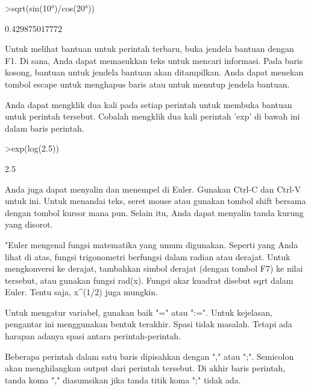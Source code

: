 \documentclass[12pt,arial,letterpaper]{book}
\begin{document}
\begin{eulerprompt}
>sqrt(sin(10°)/cos(20°))
\end{eulerprompt}
\begin{euleroutput}
  0.429875017772
\end{euleroutput}
\begin{eulercomment}
Untuk melihat bantuan untuk perintah terbaru, buka jendela bantuan
dengan F1. Di sana, Anda dapat memasukkan teks untuk mencari
informasi. Pada baris kosong, bantuan untuk jendela bantuan akan
ditampilkan. Anda dapat menekan tombol escape untuk menghapus baris
atau untuk menutup jendela bantuan.

Anda dapat mengklik dua kali pada setiap perintah untuk membuka
bantuan untuk perintah tersebut. Cobalah mengklik dua kali perintah
'exp' di bawah ini dalam baris perintah.
\end{eulercomment}
\begin{eulerprompt}
>exp(log(2.5))
\end{eulerprompt}
\begin{euleroutput}
  2.5
\end{euleroutput}
\begin{eulercomment}
Anda juga dapat menyalin dan menempel di Euler. Gunakan Ctrl-C dan
Ctrl-V untuk ini. Untuk menandai teks, seret mouse atau gunakan tombol
shift bersama dengan tombol kursor mana pun. Selain itu, Anda dapat
menyalin tanda kurung yang disorot.
\end{eulercomment}
\begin{eulercomment}

\end{eulercomment}
\begin{eulercomment}
"Euler mengenal fungsi matematika yang umum digunakan. Seperti yang
Anda lihat di atas, fungsi trigonometri berfungsi dalam radian atau
derajat. Untuk mengkonversi ke derajat, tambahkan simbol derajat
(dengan tombol F7) ke nilai tersebut, atau gunakan fungsi rad(x).
Fungsi akar kuadrat disebut sqrt dalam Euler. Tentu saja, x\textasciicircum{}(1/2) juga
mungkin.

Untuk mengatur variabel, gunakan baik "=" atau ":=". Untuk kejelasan,
pengantar ini menggunakan bentuk terakhir. Spasi tidak masalah. Tetapi
ada harapan adanya spasi antara perintah-perintah.

Beberapa perintah dalam satu baris dipisahkan dengan "," atau ";".
Semicolon akan menghilangkan output dari perintah tersebut. Di akhir
baris perintah, tanda koma "," diasumsikan jika tanda titik koma ";"
tidak ada.
\end{eulercomment}
\end{document}
